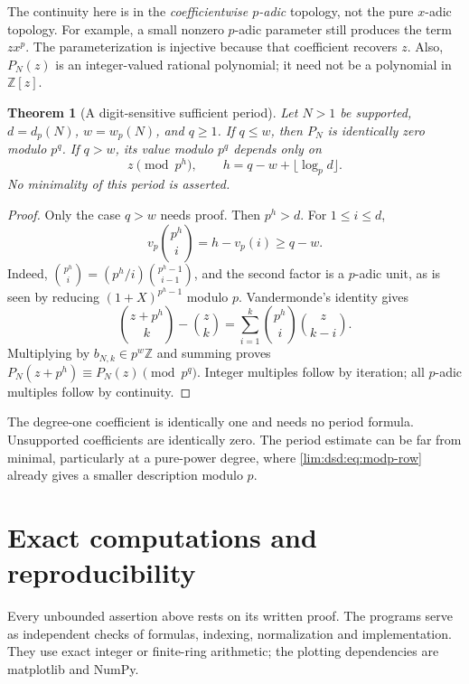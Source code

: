 \documentclass[11pt]{article}
\newtheorem{theorem}{Theorem}[section]
\theoremstyle{definition}
\theoremstyle{remark}
\newcommand{\Z}{\mathbb Z}
\begin{document}
The continuity here is in the \emph{coefficientwise $p$-adic}
topology, not the pure $x$-adic topology. For example, a small
nonzero $p$-adic parameter still produces the term $zx^p$.
The parameterization is injective because that coefficient
recovers $z$. Also, $P_N(z)$ is an integer-valued rational
polynomial; it need not be a polynomial in $\Z[z]$.

\begin{theorem}[A digit-sensitive sufficient period]
\label{lim:dsd:thm:period}
Let $N>1$ be supported, $d=d_p(N)$, $w=w_p(N)$, and $q\ge1$.
If $q\le w$, then $P_N$ is identically zero modulo $p^q$.
If $q>w$, its value modulo $p^q$ depends only on
\begin{equation}
 z\pmod{p^h},\qquad h=q-w+\lfloor\log_p d\rfloor.
 \label{lim:dsd:eq:period}
\end{equation}
No minimality of this period is asserted.
\end{theorem}
\begin{proof}
Only the case $q>w$ needs proof. Then $p^h>d$. For
$1\le i\le d$,
\begin{equation}
 v_p\binom{p^h}{i}=h-v_p(i)\ge q-w.
 \label{lim:dsd:eq:binomial-period-valuation}
\end{equation}
Indeed, $\binom{p^h}{i}=(p^h/i)\binom{p^h-1}{i-1}$,
and the second factor is a $p$-adic unit, as is seen by
reducing $(1+X)^{p^h-1}$ modulo $p$.
Vandermonde's identity gives
\[
 \binom{z+p^h}{k}-\binom zk
 =\sum_{i=1}^k\binom{p^h}{i}\binom z{k-i}.
\]
Multiplying by $b_{N,k}\in p^w\Z$ and summing proves
$P_N(z+p^h)\equiv P_N(z)\pmod{p^q}$. Integer multiples
follow by iteration; all $p$-adic multiples follow by continuity.
\end{proof}

The degree-one coefficient is identically one and needs no period
formula. Unsupported coefficients are identically zero. The period
estimate can be far from minimal, particularly at a pure-power
degree, where \eqref{lim:dsd:eq:modp-row} already gives a smaller
description modulo $p$.

\section{Exact computations and reproducibility}
\label{lim:dsd:sec:verification}

Every unbounded assertion above rests on its written proof. The
programs serve as independent checks of formulas, indexing,
normalization and implementation. They use exact integer or
finite-ring arithmetic; the plotting dependencies are matplotlib and NumPy.
\end{document}
